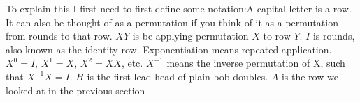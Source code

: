 \documentclass[preview]{standalone}
\begin{document}
\begin{flushleft}
To explain this I first need to first define some notation:A capital letter is a row. It can also be thought of as a permutation if you think of it as a permutation from rounds to that row. $XY$ is be applying permutation $X$ to row $Y$. $I$ is rounds, also known as the identity row. Exponentiation means repeated application. $X^0=I$, $X^1=X$, $X^2=XX$, etc. $X^{-1}$ means the inverse permutation of X, such that $X^{-1}X=I$. $H$ is the first lead head of plain bob doubles. $A$ is the row we looked at in the previous section
\end{flushleft}
\end{document}
